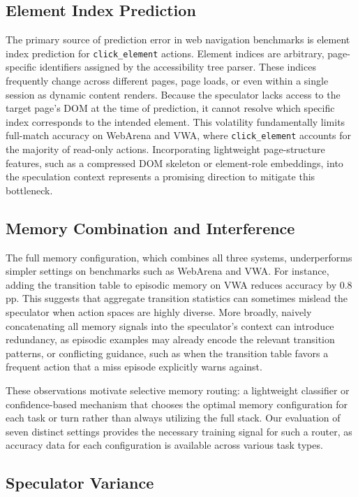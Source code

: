 \documentclass{article}
\begin{document}
\subsection{Element Index Prediction}
\label{app:index_prediction}

The primary source of prediction error in web navigation benchmarks is element index prediction for \texttt{click\_element} actions. Element indices are arbitrary, page-specific identifiers assigned by the accessibility tree parser. These indices frequently change across different pages, page loads, or even within a single session as dynamic content renders. Because the speculator lacks access to the target page's DOM at the time of prediction, it cannot resolve which specific index corresponds to the intended element. This volatility fundamentally limits full-match accuracy on WebArena and VWA, where \texttt{click\_element} accounts for the majority of read-only actions. Incorporating lightweight page-structure features, such as a compressed DOM skeleton or element-role embeddings, into the speculation context represents a promising direction to mitigate this bottleneck.

\subsection{Memory Combination and Interference}
\label{app:interference}
The full memory configuration, which combines all three systems, underperforms simpler settings on benchmarks such as WebArena and VWA. For instance, adding the transition table to episodic memory on VWA reduces accuracy by 0.8\,pp. This suggests that aggregate transition statistics can sometimes mislead the speculator when action spaces are highly diverse. More broadly, naively concatenating all memory signals into the speculator's context can introduce redundancy, as episodic examples may already encode the relevant transition patterns, or conflicting guidance, such as when the transition table favors a frequent action that a miss episode explicitly warns against.

These observations motivate selective memory routing: a lightweight classifier or confidence-based mechanism that chooses the optimal memory configuration for each task or turn rather than always utilizing the full stack. Our evaluation of seven distinct settings provides the necessary training signal for such a router, as accuracy data for each configuration is available across various task types.

\subsection{Speculator Variance}
\label{app:variance}
\end{document}
